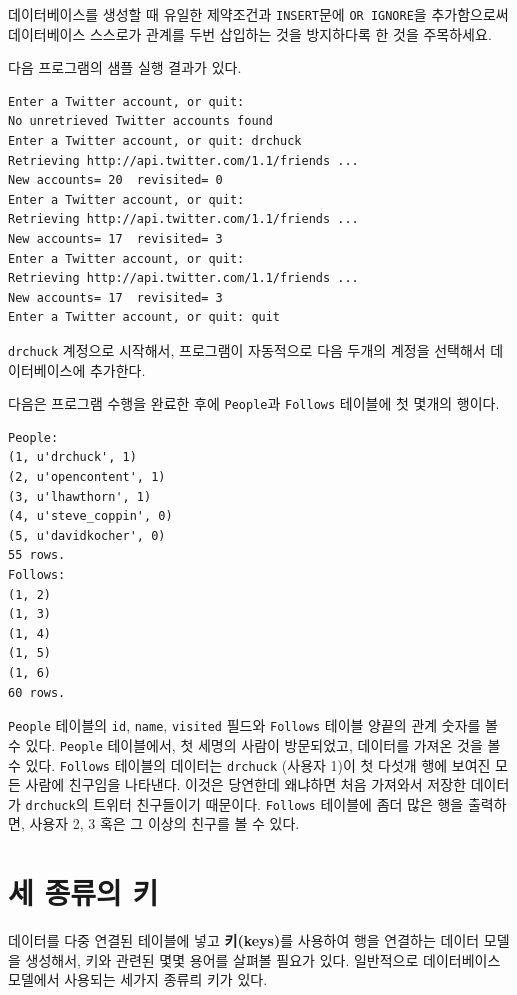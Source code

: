 데이터베이스를 생성할 때 유일한 제약조건과 {\tt INSERT}문에 {\tt OR IGNORE}을 추가함으로써 데이터베이스 스스로가 
관계를 두번 삽입하는 것을 방지하다록 한 것을 주목하세요.

다음 프로그램의 샘플 실행 결과가 있다.

\beforeverb
\begin{verbatim}
Enter a Twitter account, or quit: 
No unretrieved Twitter accounts found
Enter a Twitter account, or quit: drchuck
Retrieving http://api.twitter.com/1.1/friends ...
New accounts= 20  revisited= 0
Enter a Twitter account, or quit: 
Retrieving http://api.twitter.com/1.1/friends ...
New accounts= 17  revisited= 3
Enter a Twitter account, or quit: 
Retrieving http://api.twitter.com/1.1/friends ...
New accounts= 17  revisited= 3
Enter a Twitter account, or quit: quit
\end{verbatim}
\afterverb
%

{\tt drchuck} 계정으로 시작해서, 프로그램이 자동적으로 다음 두개의 계정을 선택해서 데이터베이스에 추가한다.

다음은 프로그램 수행을 완료한 후에 {\tt People}과 {\tt Follows} 테이블에 첫 몇개의 행이다.

\beforeverb
\begin{verbatim}
People:
(1, u'drchuck', 1)
(2, u'opencontent', 1)
(3, u'lhawthorn', 1)
(4, u'steve_coppin', 0)
(5, u'davidkocher', 0)
55 rows.
Follows:
(1, 2)
(1, 3)
(1, 4)
(1, 5)
(1, 6)
60 rows.
\end{verbatim}
\afterverb
%

{\tt People} 테이블의 {\tt id}, {\tt name}, {\tt visited} 필드와
{\tt Follows} 테이블 양끝의 관계 숫자를 볼 수 있다.
{\tt People} 테이블에서, 첫 세명의 사람이 방문되었고, 데이터를 가져온 것을 볼 수 있다.
{\tt Follows} 테이블의 데이터는 {\tt drchuck} (사용자 1)이 첫 다섯개 행에 보여진 모든 사람에 친구임을 나타낸다.
이것은 당연한데 왜냐하면 처음 가져와서 저장한 데이터가 {\tt drchuck}의 트위터 친구들이기 때문이다.
{\tt Follows} 테이블에 좀더 많은 행을 출력하면, 사용자 2, 3 혹은 그 이상의 친구를 볼 수 있다.

\section{세 종류의 키}

데이터를 다중 연결된 테이블에 넣고 {\bf 키(keys)}를 사용하여 행을 연결하는 데이터 모델을 생성해서,
키와 관련된 몇몇 용어를 살펴볼 필요가 있다. 일반적으로 데이터베이스 모델에서 사용되는 세가지 종류릐 키가 있다.

